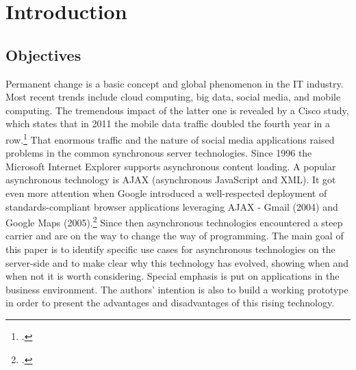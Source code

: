 \listoftables
{}
\newpage


\listoffigures
{}
\newpage

\lstlistoflistings
{}
\newpage

\renewcommand{\thepage}{\arabic{page}}

\setcounter{page}{1} 

\renewcommand{\baselinestretch}{1.4}\normalsize

\section{Introduction}
\label{sec:introduction}

\subsection{Objectives}
\label{sec:objectives}
Permanent change is a basic concept and global phenomenon in the IT industry. 
Most recent trends include cloud computing, big data, social media, and mobile computing.
The tremendous impact of the latter one is  revealed by a Cisco study, which states that in 2011 the mobile data traffic
doubled the fourth year in a row.\footcite[Cf.]{cisco_2012} That enormous traffic and the
nature of social media applications raised problems in the common synchronous server technologies.
Since 1996 the Microsoft Internet Explorer supports asynchronous content loading. A popular
asynchronous technology is AJAX (asynchronous JavaScript and XML). It got even more attention when
Google introduced a well-respected deployment of standards-compliant browser applications leveraging AJAX - Gmail (2004) 
and Google Maps (2005).\footcite[Cf.]{Swartz_2005} Since then asynchronous technologies
encountered a steep carrier and are on the way to change the way of programming.
The main goal of this paper is to identify specific use cases for asynchronous technologies on the server-side and to make clear why this technology has evolved, showing when and when not it is worth considering. Special emphasis is put on applications in the business environment. 
The authors' intention is also to build a working prototype in order to present the advantages and
disadvantages of this rising technology.

